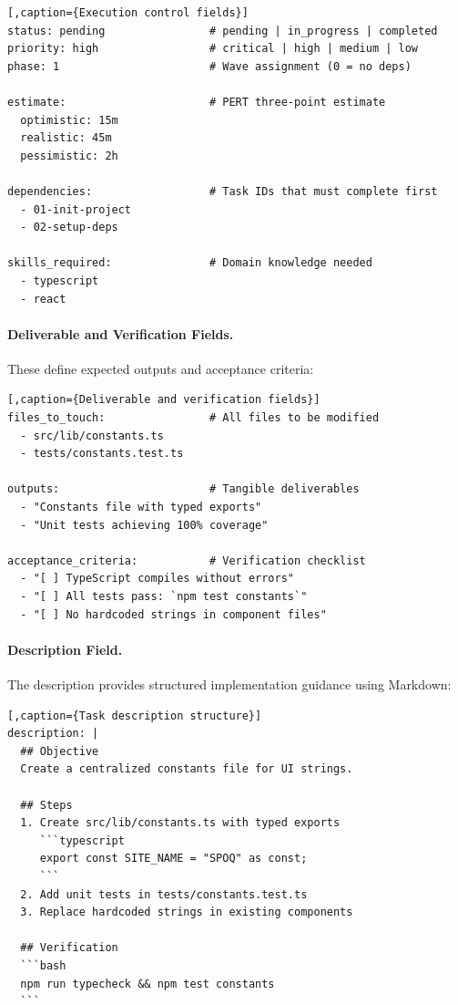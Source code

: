 \begin{lstlisting}[,caption={Execution control fields}]
status: pending                # pending | in_progress | completed
priority: high                 # critical | high | medium | low
phase: 1                       # Wave assignment (0 = no deps)

estimate:                      # PERT three-point estimate
  optimistic: 15m
  realistic: 45m
  pessimistic: 2h

dependencies:                  # Task IDs that must complete first
  - 01-init-project
  - 02-setup-deps

skills_required:               # Domain knowledge needed
  - typescript
  - react
\end{lstlisting}

\paragraph{Deliverable and Verification Fields.}
These define expected outputs and acceptance criteria:

\begin{lstlisting}[,caption={Deliverable and verification fields}]
files_to_touch:                # All files to be modified
  - src/lib/constants.ts
  - tests/constants.test.ts

outputs:                       # Tangible deliverables
  - "Constants file with typed exports"
  - "Unit tests achieving 100% coverage"

acceptance_criteria:           # Verification checklist
  - "[ ] TypeScript compiles without errors"
  - "[ ] All tests pass: `npm test constants`"
  - "[ ] No hardcoded strings in component files"
\end{lstlisting}

\needspace{12cm}
\paragraph{Description Field.}
The description provides structured implementation guidance using Markdown:

\begin{lstlisting}[,caption={Task description structure}]
description: |
  ## Objective
  Create a centralized constants file for UI strings.

  ## Steps
  1. Create src/lib/constants.ts with typed exports
     ```typescript
     export const SITE_NAME = "SPOQ" as const;
     ```
  2. Add unit tests in tests/constants.test.ts
  3. Replace hardcoded strings in existing components

  ## Verification
  ```bash
  npm run typecheck && npm test constants
  ```
\end{lstlisting}

